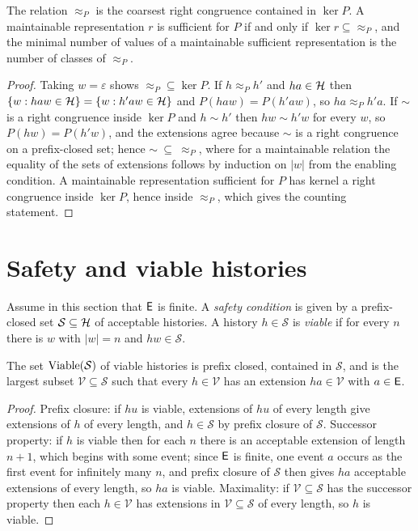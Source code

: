 \begin{established}\label{a:nerode}
The relation $\approx_P$ is the coarsest right congruence contained in $\ker P$. A maintainable representation $r$ is sufficient for $P$ if and only if $\ker r\subseteq{\approx_P}$, and the minimal number of values of a maintainable sufficient representation is the number of classes of $\approx_P$.
\end{established}
\begin{proof}
Taking $w=\varepsilon$ shows $\approx_P\subseteq\ker P$. If $h\approx_Ph'$ and $ha\in\mathcal{H}$ then $\{w:haw\in\mathcal{H}\}=\{w:h'aw\in\mathcal{H}\}$ and $P(haw)=P(h'aw)$, so $ha\approx_Ph'a$. If $\sim$ is a right congruence inside $\ker P$ and $h\sim h'$ then $hw\sim h'w$ for every $w$, so $P(hw)=P(h'w)$, and the extensions agree because $\sim$ is a right congruence on a prefix-closed set; hence $\sim\ \subseteq\ \approx_P$, where for a maintainable relation the equality of the sets of extensions follows by induction on $|w|$ from the enabling condition. A maintainable representation sufficient for $P$ has kernel a right congruence inside $\ker P$, hence inside $\approx_P$, which gives the counting statement.
\end{proof}

\section{Safety and viable histories}

Assume in this section that $\mathsf{E}$ is finite. A \emph{safety condition} is given by a prefix-closed set $\mathcal S\subseteq\mathcal{H}$ of acceptable histories. A history $h\in\mathcal S$ is \emph{viable} if for every $n$ there is $w$ with $|w|=n$ and $hw\in\mathcal S$.

\begin{established}\label{a:viable}
The set $\operatorname{Viable}(\mathcal S)$ of viable histories is prefix closed, contained in $\mathcal S$, and is the largest subset $\mathcal V\subseteq\mathcal S$ such that every $h\in\mathcal V$ has an extension $ha\in\mathcal V$ with $a\in\mathsf{E}$.
\end{established}
\begin{proof}
Prefix closure: if $hu$ is viable, extensions of $hu$ of every length give extensions of $h$ of every length, and $h\in\mathcal S$ by prefix closure of $\mathcal S$. Successor property: if $h$ is viable then for each $n$ there is an acceptable extension of length $n+1$, which begins with some event; since $\mathsf{E}$ is finite, one event $a$ occurs as the first event for infinitely many $n$, and prefix closure of $\mathcal S$ then gives $ha$ acceptable extensions of every length, so $ha$ is viable. Maximality: if $\mathcal V\subseteq\mathcal S$ has the successor property then each $h\in\mathcal V$ has extensions in $\mathcal V\subseteq\mathcal S$ of every length, so $h$ is viable.
\end{proof}

